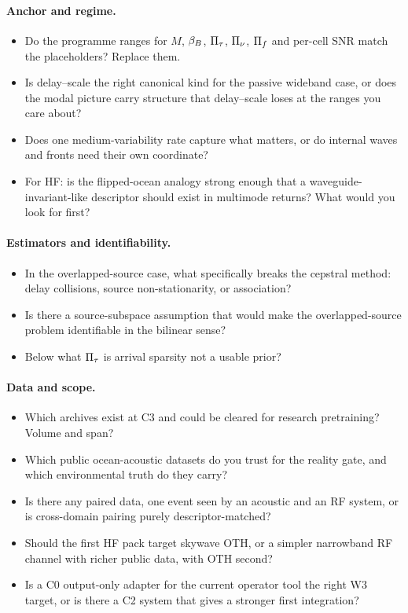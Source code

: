 \documentclass[11pt,a4paper]{article}
\begin{document}
\paragraph{Anchor and regime.}
\begin{itemize}
\item Do the programme ranges for $M$, $\beta_{B}$, $\Pi_{\tau}$, $\Pi_{\nu}$, $\Pi_{f}$ and per-cell SNR match the placeholders? Replace them.
\item Is delay--scale the right canonical kind for the passive wideband case, or does the modal picture carry structure that delay--scale loses at the ranges you care about?
\item Does one medium-variability rate capture what matters, or do internal waves and fronts need their own coordinate?
\item For HF: is the flipped-ocean analogy strong enough that a waveguide-invariant-like descriptor should exist in multimode returns? What would you look for first?
\end{itemize}
\paragraph{Estimators and identifiability.}
\begin{itemize}
\item In the overlapped-source case, what specifically breaks the cepstral method: delay collisions, source non-stationarity, or association?
\item Is there a source-subspace assumption that would make the overlapped-source problem identifiable in the bilinear sense?
\item Below what $\Pi_{\tau}$ is arrival sparsity not a usable prior?
\end{itemize}
\paragraph{Data and scope.}
\begin{itemize}
\item Which archives exist at C3 and could be cleared for research pretraining? Volume and span?
\item Which public ocean-acoustic datasets do you trust for the reality gate, and which environmental truth do they carry?
\item Is there any paired data, one event seen by an acoustic and an RF system, or is cross-domain pairing purely descriptor-matched?
\item Should the first HF pack target skywave OTH, or a simpler narrowband RF channel with richer public data, with OTH second?
\item Is a C0 output-only adapter for the current operator tool the right W3 target, or is there a C2 system that gives a stronger first integration?
\end{itemize}
\end{document}
